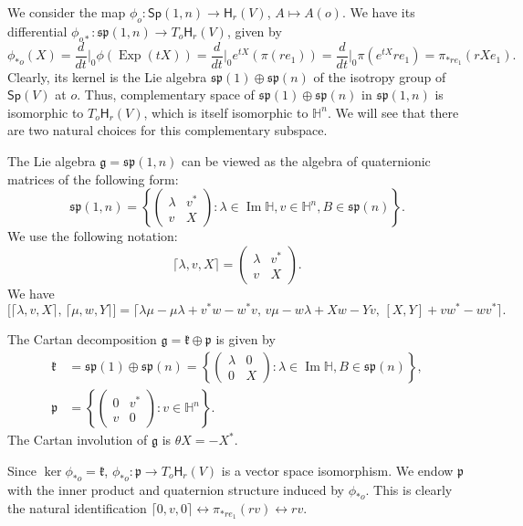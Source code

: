 \documentclass[12pt, a4paper,draft]{amsart}
\newcommand{\Exp}{\operatorname{Exp}}
\newcommand{\g}{\mathfrak}
\renewcommand{\H}{\mathbb{H}}
\renewcommand{\Im}{\operatorname{Im}}
\newcommand{\Sp}{\mathsf{Sp}}
\theoremstyle{remark}
\begin{document}
We consider the map $\phi_o\colon \Sp(1,n)\to\mathsf{H}_r(V)$, $A\mapsto A(o)$.
We have its differential $\phi_{o*}\colon\g{sp}(1,n)\to T_o\mathsf{H}_r(V)$, given by
\[
\phi_{*o}(X)
=\frac{d}{dt}\Big\vert_{0}\phi(\Exp(tX))
=\frac{d}{dt}\Big\vert_{0}e^{tX}(\pi(re_1))
=\frac{d}{dt}\Big\vert_{0}\pi(e^{tX}re_1)
=\pi_{*re_1}(rXe_1).
\]
Clearly, its kernel is the Lie algebra $\g{sp}(1)\oplus\g{sp}(n)$ of the isotropy group of $\Sp(V)$ at $o$.
Thus, complementary space of $\g{sp}(1)\oplus\g{sp}(n)$ in $\g{sp}(1,n)$ is isomorphic to $T_o\mathsf{H}_r(V)$, which is itself isomorphic to $\H^n$.
We will see that there are two natural choices for this complementary subspace.

The Lie algebra $\g{g}=\g{sp}(1,n)$ can be viewed as the algebra of quaternionic matrices of the following form:
\[
\g{sp}(1,n)=\left\{
\left(
\begin{array}{c|c}
\lambda & v^{*} \\
\hline
v & X
\end{array}
\right):
\lambda \in \Im \H,v\in \H^{n}, B\in \g{sp}(n)
\right\}.
\]
We use the following notation: 
\[
\lceil \lambda, v, X\rceil =\left(
\begin{array}{c|c}
\lambda & v^{*} \\
\hline
v & X
\end{array}
\right).
\]
We have
\[
\bigl[\lceil \lambda,v,X \rceil,\, \lceil \mu,w,Y \rceil\bigr]
=\lceil \lambda\mu-\mu\lambda+v^{*}w-w^{*}v,\, v\mu-w\lambda+Xw-Yv,\, [X,Y]+vw^{*}-wv^{*} \rceil.
\]

The Cartan decomposition $\g{g}=\g{k}\oplus\g{p}$ is given by
\[
\begin{aligned}
\g{k}&
{}=\g{sp}(1)\oplus\g{sp}(n)
=\left\{
	\left(
	\begin{array}{c|c}
		\lambda & 0 \\
		\hline
		0 & X
	\end{array}
	\right):
	\lambda \in \Im \H, B\in \g{sp}(n)
\right\}, \\
\g{p}&
{}=\left\{
\left(
	\begin{array}{c|c}
		0 & v^{*} \\
		\hline
		v & 0
	\end{array}
\right):
v\in \H ^{n}
\right\}.
\end{aligned}
\]
The Cartan involution of $\g{g}$ is $\theta X = -X^{*}$.

Since $\ker\phi_{*o}=\g{k}$, $\phi_{*o}\colon\g{p}\to T_o\mathsf{H}_r(V)$ is a vector space isomorphism.
We endow $\g{p}$ with the inner product and quaternion structure induced by $\phi_{*o}$.
This is clearly the natural identification $\lceil 0,v,0\rceil \leftrightarrow \pi_{*re_1}(rv) \leftrightarrow rv$.
\end{document}
